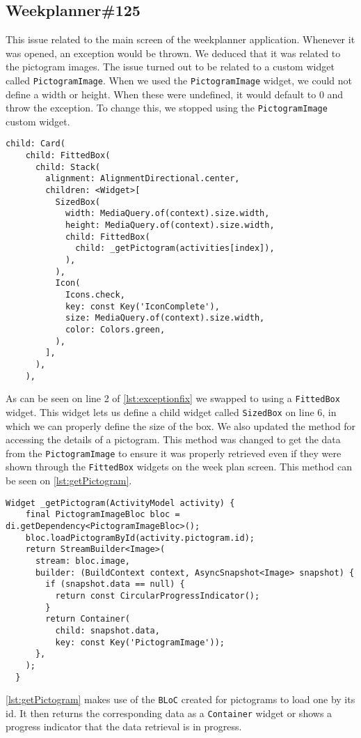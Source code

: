 \subsection{Weekplanner\#125}
This issue related to the main screen of the weekplanner application.
Whenever it was opened, an exception would be thrown.
We deduced that it was related to the pictogram images. 
The issue turned out to be related to a custom widget called \texttt{PictogramImage}.
When we used the \texttt{PictogramImage} widget, we could not define a width or height.
When these were undefined, it would default to 0 and throw the exception.
To change this, we stopped using the \texttt{PictogramImage} custom widget.

\begin{lstlisting}[caption={An excerpt showing the use of FittedBox instead of PictogramImage},label={lst:exceptionfix},language={[Sharp]C}]
  child: Card(
    child: FittedBox(
      child: Stack(
        alignment: AlignmentDirectional.center,
        children: <Widget>[
          SizedBox(
            width: MediaQuery.of(context).size.width,
            height: MediaQuery.of(context).size.width,
            child: FittedBox(
              child: _getPictogram(activities[index]),
            ),
          ),
          Icon(
            Icons.check,
            key: const Key('IconComplete'),
            size: MediaQuery.of(context).size.width,
            color: Colors.green,
          ),
        ],
      ),
    ),
\end{lstlisting}
As can be seen on line 2 of \autoref{lst:exceptionfix} we swapped to using a \texttt{FittedBox} widget. This widget lets us define a child widget called \texttt{SizedBox} on line 6, in which we can properly define the size of the box.
We also updated the method for accessing the details of a pictogram.
This method was changed to get the data from the \texttt{PictogramImage} to ensure it was properly retrieved even if they were shown through the \texttt{FittedBox} widgets on the week plan screen.
This method can be seen on \autoref{lst:getPictogram}.
\begin{lstlisting}[caption={The getPictogram method to retrieve the details of a pictogram},label={lst:getPictogram},language={[Sharp]C}]
  Widget _getPictogram(ActivityModel activity) {
    final PictogramImageBloc bloc = di.getDependency<PictogramImageBloc>();
    bloc.loadPictogramById(activity.pictogram.id);
    return StreamBuilder<Image>(
      stream: bloc.image,
      builder: (BuildContext context, AsyncSnapshot<Image> snapshot) {
        if (snapshot.data == null) {
          return const CircularProgressIndicator();
        }
        return Container(
          child: snapshot.data, 
          key: const Key('PictogramImage'));
      },
    );
  }
\end{lstlisting}
\autoref{lst:getPictogram} makes use of the \texttt{BLoC} created for pictograms to load one by its id.
It then returns the corresponding data as a \texttt{Container} widget or shows a progress indicator that the data retrieval is in progress.